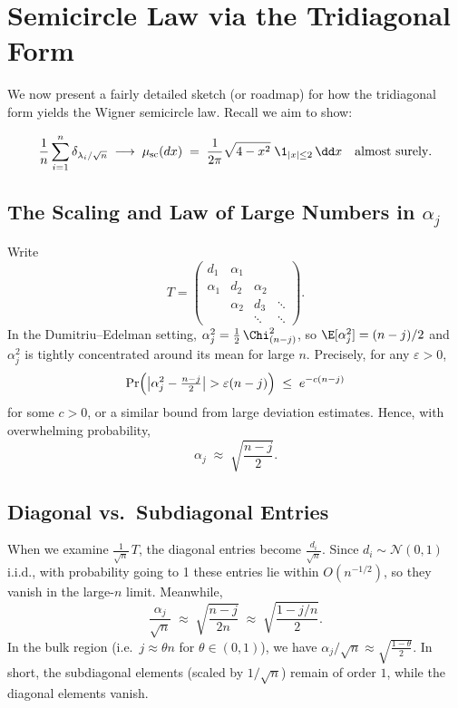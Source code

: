 \documentclass[letterpaper,11pt,oneside,reqno]{article}
\numberwithin{equation}{section}
\theoremstyle{definition}
\begin{document}
\section{Semicircle Law via the Tridiagonal Form}
\label{sec:semicircle-tridiag}

We now present a fairly detailed sketch (or roadmap) for how the tridiagonal form yields the Wigner semicircle law. Recall we aim to show:

\[
  \frac{1}{n}\sum_{i=1}^n \delta_{\lambda_i/\sqrt{n}}
  \;\longrightarrow\;
  \mu_{\mathrm{sc}}(dx)\;=\;\frac{1}{2\pi}\sqrt{4 - x^2}\;\1_{|x|\le2}\,\dd x
  \quad\text{almost surely}.
\]

\subsection{The Scaling and Law of Large Numbers in \(\alpha_j\)}

Write
\[
  T = \begin{pmatrix}
    d_1 & \alpha_1 & & \\
    \alpha_1 & d_2 & \alpha_2 & \\
    & \alpha_2 & d_3 & \ddots \\
    & & \ddots & \ddots
  \end{pmatrix}.
\]
In the Dumitriu--Edelman setting, $\alpha_j^2 = \frac{1}{2}\,\Chi^2_{(n-j)}$, so $\E[\alpha_j^2]=(n-j)/2$ and $\alpha_j^2$ is tightly concentrated around its mean for large $n$. Precisely, for any $\varepsilon>0$,
\[
  \Pr\Bigl(\bigl|\alpha_j^2 - \tfrac{n-j}{2}\bigr| > \varepsilon (n-j)\Bigr)
  \;\le\; e^{-c(n-j)}
\]
for some $c>0$, or a similar bound from large deviation estimates. Hence, with overwhelming probability,
\[
  \alpha_j \;\approx\; \sqrt{\frac{n-j}{2}}.
\]

\subsection{Diagonal vs.\ Subdiagonal Entries}

When we examine $\frac{1}{\sqrt{n}}\,T$, the diagonal entries become $\frac{d_i}{\sqrt{n}}$. Since $d_i \sim \mathcal{N}(0,1)$ i.i.d., with probability going to 1 these entries lie within $O(n^{-1/2})$, so they vanish in the large-$n$ limit. Meanwhile,
\[
  \frac{\alpha_j}{\sqrt{n}}
  \;\approx\;
  \sqrt{\frac{n-j}{2n}}
  \;\approx\;
  \sqrt{\frac{1 - j/n}{2}}.
\]
In the bulk region (i.e.\ $j\approx \theta n$ for $\theta\in (0,1)$), we have $\alpha_j/\sqrt{n} \approx \sqrt{\frac{1-\theta}{2}}$. In short, the subdiagonal elements (scaled by $1/\sqrt{n}$) remain of order $1$, while the diagonal elements vanish.
\end{document}
